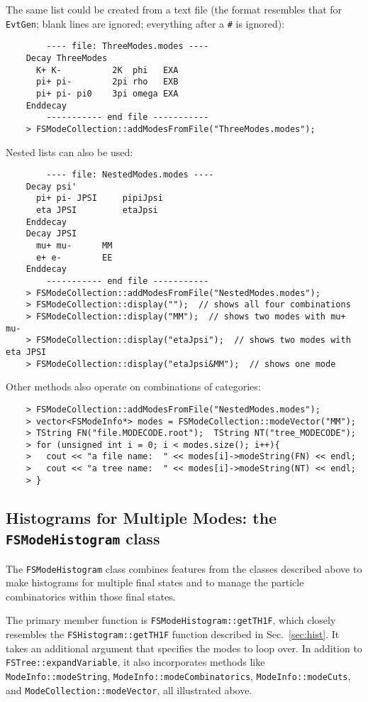 \documentclass[11pt]{article}
\begin{document}
The same list could be created from a text file (the format resembles that for {\tt EvtGen}; blank lines are ignored; everything after a {\tt \#} is ignored):
\begin{verbatim}
        ---- file: ThreeModes.modes ----
    Decay ThreeModes
      K+ K-          2K  phi   EXA
      pi+ pi-        2pi rho   EXB
      pi+ pi- pi0    3pi omega EXA
    Enddecay
        ----------- end file -----------
    > FSModeCollection::addModesFromFile("ThreeModes.modes");
\end{verbatim}
Nested lists can also be used:
\begin{verbatim}
        ---- file: NestedModes.modes ----
    Decay psi'
      pi+ pi- JPSI     pipiJpsi
      eta JPSI         etaJpsi
    Enddecay
    Decay JPSI
      mu+ mu-      MM
      e+ e-        EE
    Enddecay
        ----------- end file -----------
    > FSModeCollection::addModesFromFile("NestedModes.modes");
    > FSModeCollection::display("");  // shows all four combinations 
    > FSModeCollection::display("MM");  // shows two modes with mu+ mu- 
    > FSModeCollection::display("etaJpsi");  // shows two modes with eta JPSI 
    > FSModeCollection::display("etaJpsi&MM");  // shows one mode 
\end{verbatim}

Other methods also operate on combinations of categories:
\begin{verbatim}
    > FSModeCollection::addModesFromFile("NestedModes.modes");
    > vector<FSModeInfo*> modes = FSModeCollection::modeVector("MM");
    > TString FN("file.MODECODE.root");  TString NT("tree_MODECODE");
    > for (unsigned int i = 0; i < modes.size(); i++){ 
    >   cout << "a file name:  " << modes[i]->modeString(FN) << endl;
    >   cout << "a tree name:  " << modes[i]->modeString(NT) << endl;
    > }
\end{verbatim}


\subsection{Histograms for Multiple Modes: the {\tt FSModeHistogram} class}
\label{sec:modehist}

The {\tt FSModeHistogram} class combines features from the classes described above to make histograms for multiple final states and to manage the particle combinatorics within those final states.

The primary member function is {\tt FSModeHistogram::getTH1F}, which closely resembles the {\tt FSHistogram::getTH1F} function described in Sec.~\ref{sec:hist}.  It takes an additional argument that specifies the modes to loop over.  In addition to {\tt FSTree::expandVariable}, it also incorporates methods like {\tt ModeInfo::modeString}, {\tt ModeInfo::modeCombinatorics}, {\tt ModeInfo::modeCuts}, and {\tt ModeCollection::modeVector}, all illustrated above. 
\end{document}
